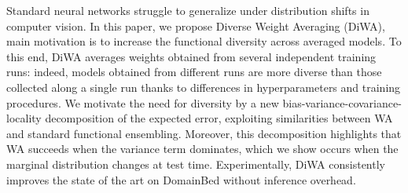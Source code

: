 Standard neural networks struggle to generalize under distribution shifts in computer vision.
In this paper, we propose Diverse Weight Averaging (DiWA),  main motivation is to increase the functional diversity across averaged models.
To this end, DiWA averages weights obtained from several independent training runs:
indeed, models obtained from different runs are more diverse than those collected along a single run thanks to differences in hyperparameters and training procedures.
We motivate the need for diversity 
by a new bias-variance-covariance-locality decomposition of the expected error, exploiting similarities between WA and standard functional ensembling.
Moreover, this decomposition highlights that WA succeeds when the variance term dominates, which we show occurs when the marginal distribution changes at test time.
Experimentally, DiWA consistently improves the state of the art on DomainBed without inference overhead.
